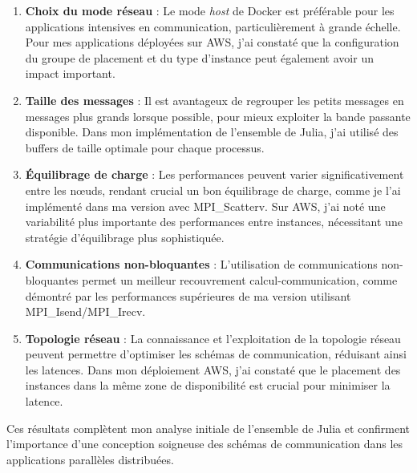 \documentclass[a4paper,11pt]{article}
\begin{document}
\begin{enumerate}
  \item \textbf{Choix du mode réseau} : Le mode \textit{host} de Docker est préférable pour les applications intensives en communication, particulièrement à grande échelle. Pour mes applications déployées sur AWS, j'ai constaté que la configuration du groupe de placement et du type d'instance peut également avoir un impact important.
  
  \item \textbf{Taille des messages} : Il est avantageux de regrouper les petits messages en messages plus grands lorsque possible, pour mieux exploiter la bande passante disponible. Dans mon implémentation de l'ensemble de Julia, j'ai utilisé des buffers de taille optimale pour chaque processus.
  
  \item \textbf{Équilibrage de charge} : Les performances peuvent varier significativement entre les nœuds, rendant crucial un bon équilibrage de charge, comme je l'ai implémenté dans ma version avec MPI\_Scatterv. Sur AWS, j'ai noté une variabilité plus importante des performances entre instances, nécessitant une stratégie d'équilibrage plus sophistiquée.
  
  \item \textbf{Communications non-bloquantes} : L'utilisation de communications non-bloquantes permet un meilleur recouvrement calcul-communication, comme démontré par les performances supérieures de ma version utilisant MPI\_Isend/MPI\_Irecv.
  
  \item \textbf{Topologie réseau} : La connaissance et l'exploitation de la topologie réseau peuvent permettre d'optimiser les schémas de communication, réduisant ainsi les latences. Dans mon déploiement AWS, j'ai constaté que le placement des instances dans la même zone de disponibilité est crucial pour minimiser la latence.
\end{enumerate}

Ces résultats complètent mon analyse initiale de l'ensemble de Julia et confirment l'importance d'une conception soigneuse des schémas de communication dans les applications parallèles distribuées.
\end{document}
